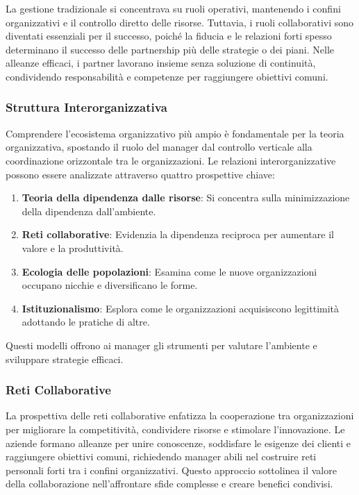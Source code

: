 \documentclass{article}
\begin{document}
La gestione tradizionale si concentrava su ruoli operativi, mantenendo i confini organizzativi e il controllo diretto delle risorse. Tuttavia, i ruoli collaborativi sono diventati essenziali per il successo, poiché la fiducia e le relazioni forti spesso determinano il successo delle partnership più delle strategie o dei piani. Nelle alleanze efficaci, i partner lavorano insieme senza soluzione di continuità, condividendo responsabilità e competenze per raggiungere obiettivi comuni.

\subsubsection{Struttura Interorganizzativa}

Comprendere l'ecosistema organizzativo più ampio è fondamentale per la teoria organizzativa, spostando il ruolo del manager dal controllo verticale alla coordinazione orizzontale tra le organizzazioni. Le relazioni interorganizzative possono essere analizzate attraverso quattro prospettive chiave:

\begin{enumerate}
    \item \textbf{Teoria della dipendenza dalle risorse}: Si concentra sulla minimizzazione della dipendenza dall'ambiente.
    \item \textbf{Reti collaborative}: Evidenzia la dipendenza reciproca per aumentare il valore e la produttività.
    \item \textbf{Ecologia delle popolazioni}: Esamina come le nuove organizzazioni occupano nicchie e diversificano le forme.
    \item \textbf{Istituzionalismo}: Esplora come le organizzazioni acquisiscono legittimità adottando le pratiche di altre.
\end{enumerate}

Questi modelli offrono ai manager gli strumenti per valutare l'ambiente e sviluppare strategie efficaci.

\subsubsection{Reti Collaborative}

La prospettiva delle reti collaborative enfatizza la cooperazione tra organizzazioni per migliorare la competitività, condividere risorse e stimolare l'innovazione. Le aziende formano alleanze per unire conoscenze, soddisfare le esigenze dei clienti e raggiungere obiettivi comuni, richiedendo manager abili nel costruire reti personali forti tra i confini organizzativi. Questo approccio sottolinea il valore della collaborazione nell'affrontare sfide complesse e creare benefici condivisi.
\end{document}
